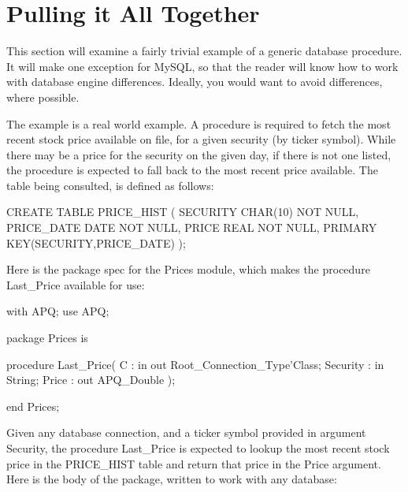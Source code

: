 \documentclass[english,letterpaper]{book}
\begin{document}
\section{Pulling it All Together}

This section will examine a fairly trivial example of a generic database
procedure. It will make one exception for MySQL, so that the reader
will know how to work with database engine differences. Ideally, you
would want to avoid differences, where possible.

The example is a real world example. A procedure is required to fetch
the most recent stock price available on file, for a given security
(by ticker symbol). While there may be a price for the security on
the given day, if there is not one listed, the procedure is expected
to fall back to the most recent price available. The table being consulted,
is defined as follows:\label{PRICE_HIST Table Definition}

\begin{SQL}
CREATE TABLE PRICE_HIST (
    SECURITY   CHAR(10) NOT NULL,
    PRICE_DATE DATE NOT NULL,
    PRICE      REAL NOT NULL,
    PRIMARY KEY(SECURITY,PRICE_DATE)
);
\end{SQL}

Here is the package spec for the Prices module, which makes the procedure
Last\_Price available for use:

\begin{Example}
with APQ;
use APQ;
  
package Prices is
  
   procedure Last_Price(
      C :       in out Root_Connection_Type'Class;
      Security : in     String;
      Price :       out APQ_Double
   );
 
end Prices;
\end{Example}

Given any database connection, and a ticker symbol provided in argument
Security, the procedure Last\_Price is expected to lookup the most
recent stock price in the PRICE\_HIST table and return that price
in the Price argument. Here is the body of the package, written to
work with any database:
\end{document}
